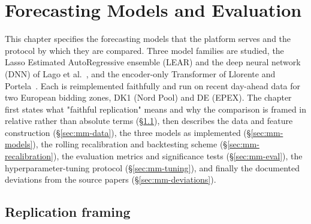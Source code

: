 
\chapter{Forecasting Models and Evaluation}
\label{ch:methods-models}

This chapter specifies the forecasting models that the platform serves and the
protocol by which they are compared. Three model families are studied, the
Lasso Estimated AutoRegressive ensemble (LEAR) and the deep neural network
(DNN) of Lago et al.~\cite{lago2021}, and the encoder-only Transformer of
Llorente and Portela~\cite{llorente2025transformer}. Each is reimplemented
faithfully and run on recent day-ahead data for two European bidding zones,
DK1 (Nord Pool) and DE (EPEX). The chapter first states what "faithful
replication" means and why the comparison is framed in relative rather than
absolute terms (\S\ref{sec:mm-framing}), then describes the data and feature
construction (\S\ref{sec:mm-data}), the three models as implemented
(\S\ref{sec:mm-models}), the rolling recalibration and backtesting scheme
(\S\ref{sec:mm-recalibration}), the evaluation metrics and significance tests
(\S\ref{sec:mm-eval}), the hyperparameter-tuning protocol
(\S\ref{sec:mm-tuning}), and finally the documented deviations from the source
papers (\S\ref{sec:mm-deviations}).

\section{Replication framing}
\label{sec:mm-framing}

